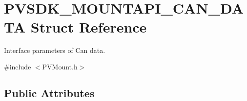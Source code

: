 \hypertarget{struct_p_v_s_d_k___m_o_u_n_t_a_p_i___c_a_n___d_a_t_a}{}\section{P\+V\+S\+D\+K\+\_\+\+M\+O\+U\+N\+T\+A\+P\+I\+\_\+\+C\+A\+N\+\_\+\+D\+A\+TA Struct Reference}
\label{struct_p_v_s_d_k___m_o_u_n_t_a_p_i___c_a_n___d_a_t_a}


Interface parameters of Can data.  




{\ttfamily \#include $<$P\+V\+Mount.\+h$>$}

\subsection*{Public Attributes}

